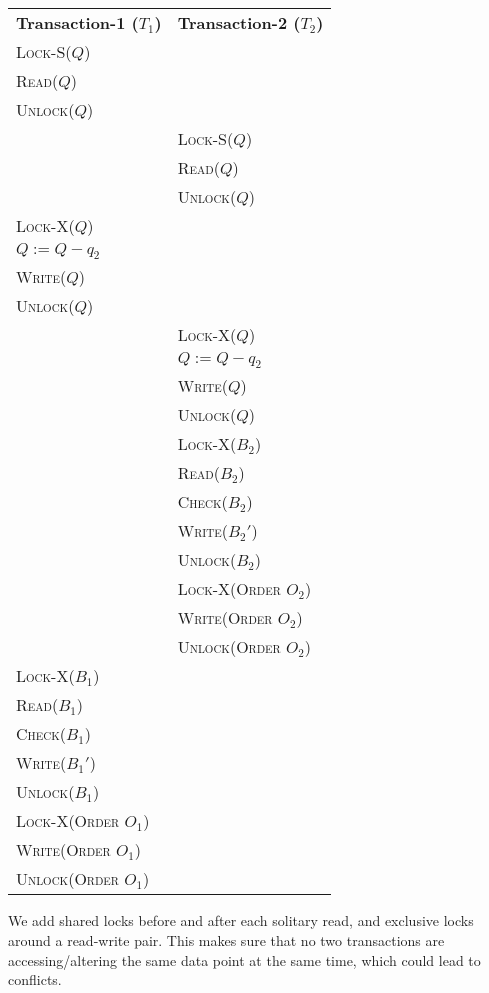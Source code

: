\begin{center}
    \begin{adjustbox}{width=\textwidth}
        \begin{tabularx}{\textwidth}{|X|X|}
        \hline
        \multirow{2}{*}{\textbf{Transaction-1 ($T_{1}$)}} & \multirow{2}{*}{\textbf{Transaction-2 ($T_{2}$)}} \\
        & \\ \hline
        \textsc{Lock-S($Q$)} & \\
        \textsc{Read($Q$)} & \\
        \textsc{Unlock($Q$)} & \\
        & \textsc{Lock-S($Q$)} \\
        & \textsc{Read($Q$)} \\
        & \textsc{Unlock($Q$)} \\
        \textsc{Lock-X($Q$)} & \\
        \textsc{$Q := Q - q_{2}$} & \\
        \textsc{Write($Q$)} & \\
        \textsc{Unlock($Q$)} & \\
        & \textsc{Lock-X($Q$)} \\
        & \textsc{$Q := Q - q_{2}$} \\
        & \textsc{Write($Q$)} \\
        & \textsc{Unlock($Q$)} \\
        & \textsc{Lock-X($B_{2}$)} \\
        & \textsc{Read($B_{2}$)} \\
        & \textsc{Check($B_{2}$)} \\
        & \textsc{Write($B_{2}'$)} \\
        & \textsc{Unlock($B_{2}$)} \\
        & \textsc{Lock-X(Order $O_{2}$)} \\
        & \textsc{Write(Order $O_{2}$)} \\
        & \textsc{Unlock(Order $O_{2}$)} \\
        \textsc{Lock-X($B_{1}$)} & \\
        \textsc{Read($B_{1}$)} & \\
        \textsc{Check($B_{1}$)} & \\
        \textsc{Write($B_{1}'$)} & \\
        \textsc{Unlock($B_{1}$)} & \\
        \textsc{Lock-X(Order $O_{1}$)} & \\
        \textsc{Write(Order $O_{1}$)} & \\
        \textsc{Unlock(Order $O_{1}$)} & \\
        \hline
        \end{tabularx}
    \end{adjustbox}
\end{center}
\vspace*{10pt}
We add shared locks before and after each solitary read, and exclusive locks around a read-write pair.
This makes sure that no two transactions are accessing/altering the same data point at the same time,
which could lead to conflicts.